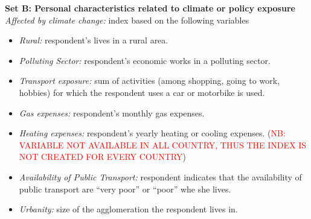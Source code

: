 \documentclass{article}
\begin{document}
\bigskip 

\noindent \textbf{Set B: Personal characteristics related to climate or policy exposure}\\
\textit{Affected by climate change:} index based on the following variables
\begin{itemize}
	\item \textit{Rural:} respondent's lives in a rural area.
	\item \textit{Polluting Sector:} respondent's economic works in a polluting sector.
	\item \textit{Transport exposure:} sum of activities (among shopping, going to work, hobbies) for which the respondent uses a car or motorbike is used.
	\item \textit{Gas expenses:} respondent's monthly gas expenses.
	\item \textit{Heating expenses:} respondent's yearly heating or cooling expenses. (\textcolor{red}{NB: VARIABLE NOT AVAILABLE IN ALL COUNTRY, THUS THE INDEX IS NOT CREATED FOR EVERY COUNTRY})
	\item \textit{Availability of Public Transport:} respondent indicates that the availability of public transport are ``very poor'' or ``poor'' whe she lives.
	\item \textit{Urbanity:} size of the agglomeration the respondent lives in.
\end{itemize}
\end{document}
